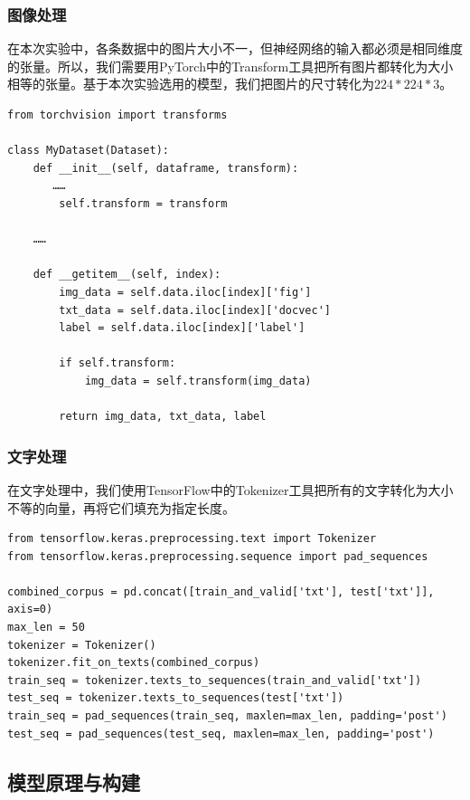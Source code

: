 \documentclass{article}
\begin{document}
\subsubsection{图像处理}
在本次实验中，各条数据中的图片大小不一，但神经网络的输入都必须是相同维度的张量。所以，我们需要用PyTorch中的Transform工具把所有图片都转化为大小相等的张量。基于本次实验选用的模型，我们把图片的尺寸转化为$224*224*3$。
\begin{lstlisting}
from torchvision import transforms

class MyDataset(Dataset):
    def __init__(self, dataframe, transform):
       ……
        self.transform = transform

    ……

    def __getitem__(self, index):
        img_data = self.data.iloc[index]['fig']
        txt_data = self.data.iloc[index]['docvec']
        label = self.data.iloc[index]['label']

        if self.transform:
            img_data = self.transform(img_data)

        return img_data, txt_data, label
\end{lstlisting}

\subsubsection{文字处理}
在文字处理中，我们使用TensorFlow中的Tokenizer工具把所有的文字转化为大小不等的向量，再将它们填充为指定长度。
\begin{lstlisting}
from tensorflow.keras.preprocessing.text import Tokenizer
from tensorflow.keras.preprocessing.sequence import pad_sequences

combined_corpus = pd.concat([train_and_valid['txt'], test['txt']], axis=0)
max_len = 50
tokenizer = Tokenizer()
tokenizer.fit_on_texts(combined_corpus)
train_seq = tokenizer.texts_to_sequences(train_and_valid['txt'])
test_seq = tokenizer.texts_to_sequences(test['txt'])
train_seq = pad_sequences(train_seq, maxlen=max_len, padding='post')
test_seq = pad_sequences(test_seq, maxlen=max_len, padding='post')
\end{lstlisting}

\subsection{模型原理与构建}
\end{document}
